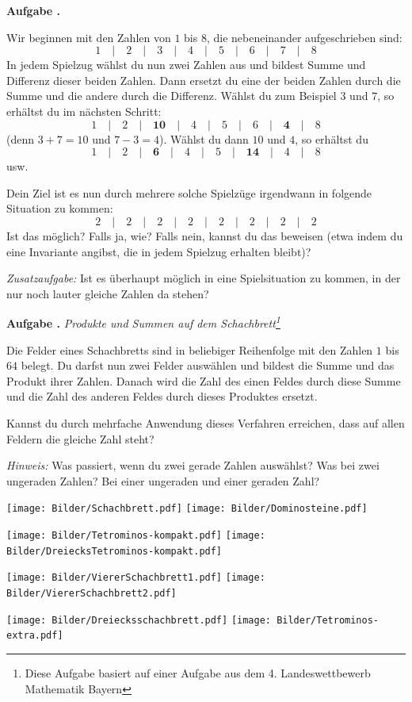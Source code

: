 \documentclass[a4paper,ngerman,12pt]{scrartcl}
\theoremstyle{definition}
\theoremstyle{plain}
\theoremstyle{remark}
\newlength{\aufgabenskip}
\newcounter{aufgabennummer}
\newenvironment{aufgabe}[1]{
	\addtocounter{aufgabennummer}{1}
	\textbf{Aufgabe \theaufgabennummer.} \emph{#1} \par
}{\vspace{\aufgabenskip}}
\begin{document}
\begin{aufgabe}{}
	Wir beginnen mit den Zahlen von $1$ bis $8$, die nebeneinander aufgeschrieben sind:
		\[1 \quad\vert\quad 2 \quad\vert\quad 3 \quad\vert\quad 4 \quad\vert\quad 5 \quad\vert\quad 6 \quad\vert\quad 7 \quad\vert\quad 8\]
	In jedem Spielzug wählst du nun zwei Zahlen aus und bildest Summe und Differenz dieser beiden Zahlen. Dann ersetzt du eine der beiden Zahlen durch die Summe und die andere durch die Differenz. Wählst du zum Beispiel $3$ und $7$, so erhältst du im nächsten Schritt:
		\[1 \quad\vert\quad 2 \quad\vert\quad \mathbf{10} \quad\vert\quad 4 \quad\vert\quad 5 \quad\vert\quad 6 \quad\vert\quad \mathbf{4} \quad\vert\quad 8\]
	(denn $3+7=10$ und $7-3=4$). Wählst du dann $10$ und $4$, so erhältst du
		\[1 \quad\vert\quad 2 \quad\vert\quad \mathbf{6} \quad\vert\quad 4 \quad\vert\quad 5 \quad\vert\quad \mathbf{14} \quad\vert\quad 4 \quad\vert\quad 8\]
	usw.
	
	Dein Ziel ist es nun durch mehrere solche Spielzüge irgendwann in folgende Situation zu kommen:
		\[2 \quad\vert\quad 2 \quad\vert\quad 2 \quad\vert\quad 2 \quad\vert\quad 2 \quad\vert\quad 2 \quad\vert\quad 2 \quad\vert\quad 2\]		
	Ist das möglich? Falls ja, wie? Falls nein, kannst du das beweisen (etwa indem du eine Invariante angibst, die in jedem Spielzug erhalten bleibt)?
	
	\emph{Zusatzaufgabe:} Ist es überhaupt möglich in eine Spielsituation zu kommen, in der nur noch lauter gleiche Zahlen da stehen?
\end{aufgabe}

\begin{aufgabe}{Produkte und Summen auf dem Schachbrett\footnote{Diese Aufgabe basiert auf einer Aufgabe aus dem 4. Landeswettbewerb Mathematik Bayern}}
	Die Felder eines Schachbretts sind in beliebiger Reihenfolge mit den Zahlen $1$ bis $64$ belegt. Du darfst nun zwei Felder auswählen und bildest die Summe und das Produkt ihrer Zahlen. Danach wird die Zahl des einen Feldes durch diese Summe und die Zahl des anderen Feldes durch dieses Produktes ersetzt. 
	
	Kannst du durch mehrfache Anwendung dieses Verfahren erreichen, dass auf allen Feldern die gleiche Zahl steht?
	
	\emph{Hinweis:} Was passiert, wenn du zwei gerade Zahlen auswählst? Was bei zwei ungeraden Zahlen? Bei einer ungeraden und einer geraden Zahl?
\end{aufgabe}

\newpage

\texttt{[image: Bilder/Schachbrett.pdf]}
\texttt{[image: Bilder/Dominosteine.pdf]}

\texttt{[image: Bilder/Tetrominos-kompakt.pdf]}
\texttt{[image: Bilder/DreiecksTetrominos-kompakt.pdf]}

\texttt{[image: Bilder/ViererSchachbrett1.pdf]}
\texttt{[image: Bilder/ViererSchachbrett2.pdf]}

\texttt{[image: Bilder/Dreiecksschachbrett.pdf]}
\texttt{[image: Bilder/Tetrominos-extra.pdf]}
\end{document}
